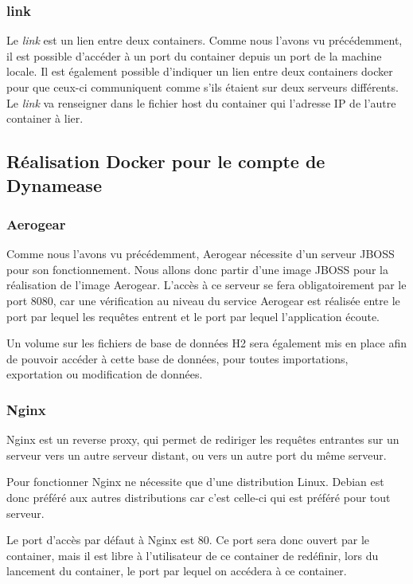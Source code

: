 \subsubsection{link}

Le \textit{link} est un lien entre deux containers. Comme nous l'avons vu précédemment, il est possible d'accéder à un port du container depuis un port de la machine locale. Il est également possible d'indiquer un lien entre deux containers docker pour que ceux-ci communiquent comme s'ils étaient sur deux serveurs différents. Le \textit{link} va renseigner dans le fichier host du container qui l'adresse IP de l'autre container à lier.

\subsection{Réalisation Docker pour le compte de Dynamease}

\subsubsection{Aerogear}

Comme nous l'avons vu précédemment, Aerogear nécessite d'un serveur JBOSS pour son fonctionnement. Nous allons donc partir d'une image JBOSS pour la réalisation de l'image Aerogear. L'accès à ce serveur se fera obligatoirement par le port 8080, car une vérification au niveau du service Aerogear est réalisée entre le port par lequel les requêtes entrent et le port par lequel l'application écoute.

Un volume sur les fichiers de base de données H2 sera également mis en place afin de pouvoir accéder à cette base de données, pour toutes importations, exportation ou modification de données.

\subsubsection{Nginx}

Nginx est un reverse proxy, qui permet de rediriger les requêtes entrantes sur un serveur vers un autre serveur distant, ou vers un autre port du même serveur.

Pour fonctionner Nginx ne nécessite que d'une distribution Linux. Debian est donc préféré aux autres distributions car c'est celle-ci qui est préféré pour tout serveur.

Le port d'accès par défaut à Nginx est 80. Ce port sera donc ouvert par le container, mais il est libre à l'utilisateur de ce container de redéfinir, lors du lancement du container, le port par lequel on accédera à ce container.

